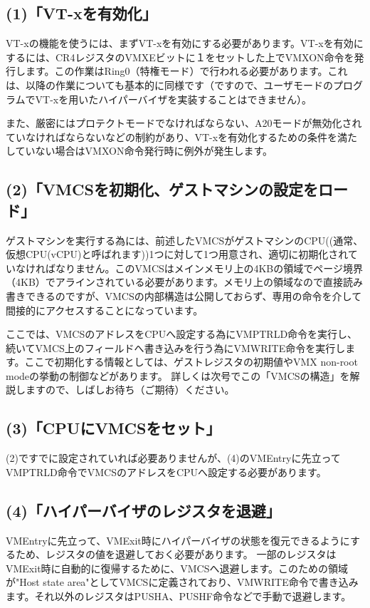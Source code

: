 \subsection*{(1)「VT-xを有効化」}
VT-xの機能を使うには、まずVT-xを有効にする必要があります。VT-xを有効にするには、CR4レジスタのVMXEビットに１をセットした上でVMXON命令を発行します。この作業はRing0（特権モード）で行われる必要があります。これは、以降の作業についても基本的に同様です（ですので、ユーザモードのプログラムでVT-xを用いたハイパーバイザを実装することはできません）。

また、厳密にはプロテクトモードでなければならない、A20モードが無効化されていなければならないなどの制約があり、VT-xを有効化するための条件を満たしていない場合はVMXON命令発行時に例外が発生します。

\subsection*{(2)「VMCSを初期化、ゲストマシンの設定をロード」}
ゲストマシンを実行する為には、前述したVMCSがゲストマシンのCPU((通常、仮想CPU(vCPU)と呼ばれます))1つに対して1つ用意され、適切に初期化されていなければなりません。このVMCSはメインメモリ上の4KBの領域でページ境界（4KB）でアラインされている必要があります。メモリ上の領域なので直接読み書きできるのですが、VMCSの内部構造は公開しておらず、専用の命令を介して間接的にアクセスすることになっています。

ここでは、VMCSのアドレスをCPUへ設定する為にVMPTRLD命令を実行し、続いてVMCS上のフィールドへ書き込みを行う為にVMWRITE命令を実行します。ここで初期化する情報としては、ゲストレジスタの初期値やVMX non-root modeの挙動の制御などがあります。
詳しくは次号でこの「VMCSの構造」を解説しますので、しばしお待ち（ご期待）ください。

\subsection*{(3)「CPUにVMCSをセット」}
(2)ですでに設定されていれば必要ありませんが、(4)のVMEntryに先立ってVMPTRLD命令でVMCSのアドレスをCPUへ設定する必要があります。

\subsection*{(4)「ハイパーバイザのレジスタを退避」}
VMEntryに先立って、VMExit時にハイパーバイザの状態を復元できるようにするため、レジスタの値を退避しておく必要があります。
一部のレジスタはVMExit時に自動的に復帰するために、VMCSへ退避します。このための領域が"Host state area"としてVMCSに定義されており、VMWRITE命令で書き込みます。それ以外のレジスタはPUSHA、PUSHF命令などで手動で退避します。

